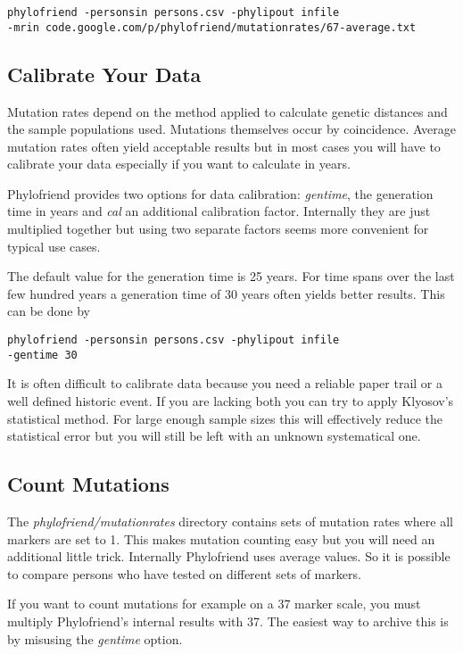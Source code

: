 \noindent\texttt{phylofriend -personsin persons.csv -phylipout infile\\
-mrin code.google.com/p/phylofriend/mutationrates/67-average.txt}


\subsection{Calibrate Your Data}

Mutation rates depend on the method applied to calculate
genetic distances and the sample populations used. Mutations
themselves occur by coincidence. Average mutation rates
often yield acceptable results but in most cases you will
have to calibrate your data especially if you want to
calculate in years.

Phylofriend provides two options for data calibration:
\emph{gentime}, the generation time in years and
\emph{cal} an additional calibration factor. Internally
they are just multiplied together but using two separate
factors seems more convenient for typical use cases.

The default value for the generation time is 25 years.
For time spans over the last few hundred years a generation
time of 30 years often yields better results. This can
be done by

\noindent\texttt{phylofriend -personsin persons.csv -phylipout infile\\
-gentime 30}

It is often difficult to calibrate data because you need a
reliable paper trail or a well defined historic event. If
you are lacking both you can try to apply Klyosov's statistical
method\cite{Kly09}. For large enough sample sizes this will
effectively reduce the statistical error but you will still
be left with an unknown systematical one.


\subsection{Count Mutations}

The \emph{phylofriend/mutationrates} directory contains
sets of mutation rates where all markers are set to 1.
This makes mutation counting easy but you will need an
additional little trick. Internally Phylofriend uses
average values. So it is possible to compare persons who
have tested on different sets of markers.

If you want to count mutations for example on a 37 marker
scale, you must multiply Phylofriend's internal results with
37. The easiest way to archive this is by misusing the
\emph{gentime} option. 

